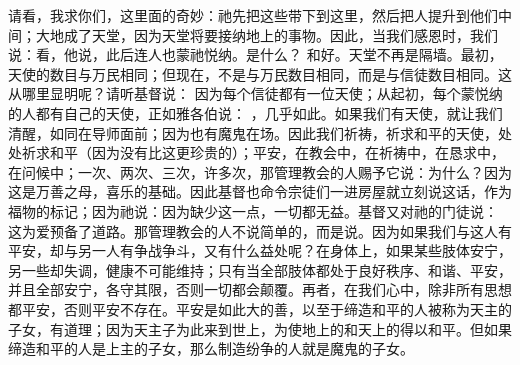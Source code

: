 请看，我求你们，这里面的奇妙：祂先把这些带下到这里，然后把人提升到他们中间；大地成了天堂，因为天堂将要接纳地上的事物。因此，当我们感恩时，我们说：看，他说，此后连人也蒙祂悦纳。是什么？ 和好。天堂不再是隔墙。最初，天使的数目与万民相同；但现在，不是与万民数目相同，而是与信徒数目相同。这从哪里显明呢？请听基督说： 因为每个信徒都有一位天使；从起初，每个蒙悦纳的人都有自己的天使，正如雅各伯说： ，几乎如此。如果我们有天使，就让我们清醒，如同在导师面前；因为也有魔鬼在场。因此我们祈祷，祈求和平的天使，处处祈求和平（因为没有比这更珍贵的）；平安，在教会中，在祈祷中，在恳求中，在问候中；一次、两次、三次，许多次，那管理教会的人赐予它说：为什么？因为这是万善之母，喜乐的基础。因此基督也命令宗徒们一进房屋就立刻说这话，作为福物的标记；因为祂说：因为缺少这一点，一切都无益。基督又对祂的门徒说： 这为爱预备了道路。那管理教会的人不说简单的，而是说。因为如果我们与这人有平安，却与另一人有争战争斗，又有什么益处呢？在身体上，如果某些肢体安宁，另一些却失调，健康不可能维持；只有当全部肢体都处于良好秩序、和谐、平安，并且全部安宁，各守其限，否则一切都会颠覆。再者，在我们心中，除非所有思想都平安，否则平安不存在。平安是如此大的善，以至于缔造和平的人被称为天主的子女，有道理；因为天主子为此来到世上，为使地上的和天上的得以和平。但如果缔造和平的人是上主的子女，那么制造纷争的人就是魔鬼的子女。\par

